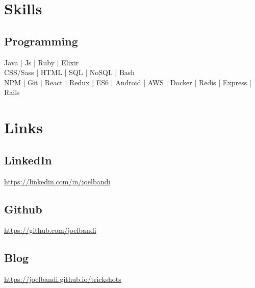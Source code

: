 \documentclass[]{base}
\begin{document}
\begin{minipage}[t]{0.33\textwidth}
	\sectionsep
	
	\section{Skills}
	\subsection{Programming}
	Java | Js | Ruby | Elixir \\
	CSS/Sass | HTML | SQL | NoSQL | Bash \\
	NPM | Git | React | Redux | ES6 | Android | AWS | Docker | Redis | Express | Rails
	\section{Links}
	\subsection{LinkedIn}
	\url{https://linkedin.com/in/joelbandi}\\
	\subsection{Github}
	\url{https://github.com/joelbandi}\\
	\subsection{Blog}
	\url{https://joelbandi.github.io/trickshots}\\
	
	
\end{minipage}
\end{document}
